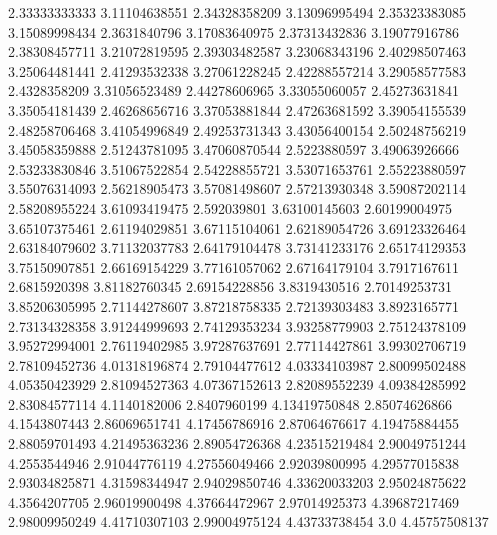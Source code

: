   2.33333333333    3.11104638551
  2.34328358209    3.13096995494
  2.35323383085    3.15089998434
   2.3631840796    3.17083640975
  2.37313432836    3.19077916786
  2.38308457711    3.21072819595
  2.39303482587    3.23068343196
  2.40298507463    3.25064481441
  2.41293532338    3.27061228245
  2.42288557214    3.29058577583
   2.4328358209    3.31056523489
  2.44278606965    3.33055060057
  2.45273631841    3.35054181439
  2.46268656716    3.37053881844
  2.47263681592    3.39054155539
  2.48258706468    3.41054996849
  2.49253731343    3.43056400154
  2.50248756219    3.45058359888
  2.51243781095    3.47060870544
   2.5223880597    3.49063926666
  2.53233830846    3.51067522854
  2.54228855721    3.53071653761
  2.55223880597    3.55076314093
  2.56218905473    3.57081498607
  2.57213930348    3.59087202114
  2.58208955224    3.61093419475
    2.592039801    3.63100145603
  2.60199004975    3.65107375461
  2.61194029851    3.67115104061
  2.62189054726    3.69123326464
  2.63184079602    3.71132037783
  2.64179104478    3.73141233176
  2.65174129353    3.75150907851
  2.66169154229    3.77161057062
  2.67164179104     3.7917167611
   2.6815920398    3.81182760345
  2.69154228856     3.8319430516
  2.70149253731    3.85206305995
  2.71144278607    3.87218758335
  2.72139303483     3.8923165771
  2.73134328358    3.91244999693
  2.74129353234    3.93258779903
  2.75124378109    3.95272994001
  2.76119402985    3.97287637691
  2.77114427861    3.99302706719
  2.78109452736    4.01318196874
  2.79104477612    4.03334103987
  2.80099502488    4.05350423929
  2.81094527363    4.07367152613
  2.82089552239    4.09384285992
  2.83084577114     4.1140182006
   2.8407960199    4.13419750848
  2.85074626866     4.1543807443
  2.86069651741    4.17456786916
  2.87064676617    4.19475884455
  2.88059701493    4.21495363236
  2.89054726368    4.23515219484
  2.90049751244     4.2553544946
  2.91044776119    4.27556049466
  2.92039800995    4.29577015838
  2.93034825871    4.31598344947
  2.94029850746    4.33620033203
  2.95024875622     4.3564207705
  2.96019900498    4.37664472967
  2.97014925373    4.39687217469
  2.98009950249    4.41710307103
  2.99004975124    4.43733738454
            3.0    4.45757508137
